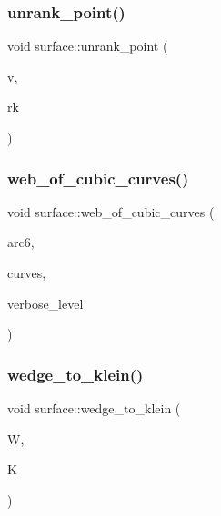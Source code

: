 \mbox{\label{classsurface_a69c1875a5c1c69b9ad81a277dd99a0b3}} 
\subsubsection{\texorpdfstring{unrank\+\_\+point()}{unrank\_point()}}
{\footnotesize\ttfamily void surface\+::unrank\+\_\+point (\begin{DoxyParamCaption}\item[{\mbox{\hyperlink{galois_8h_a09fddde158a3a20bd2dcadb609de11dc}{I\+NT}} $\ast$}]{v,  }\item[{\mbox{\hyperlink{galois_8h_a09fddde158a3a20bd2dcadb609de11dc}{I\+NT}}}]{rk }\end{DoxyParamCaption})}

\mbox{\label{classsurface_a1d3f87488282639824a97159d935e068}} 
\subsubsection{\texorpdfstring{web\+\_\+of\+\_\+cubic\+\_\+curves()}{web\_of\_cubic\_curves()}}
{\footnotesize\ttfamily void surface\+::web\+\_\+of\+\_\+cubic\+\_\+curves (\begin{DoxyParamCaption}\item[{\mbox{\hyperlink{galois_8h_a09fddde158a3a20bd2dcadb609de11dc}{I\+NT}} $\ast$}]{arc6,  }\item[{\mbox{\hyperlink{galois_8h_a09fddde158a3a20bd2dcadb609de11dc}{I\+NT}} $\ast$\&}]{curves,  }\item[{\mbox{\hyperlink{galois_8h_a09fddde158a3a20bd2dcadb609de11dc}{I\+NT}}}]{verbose\+\_\+level }\end{DoxyParamCaption})}

\mbox{\label{classsurface_aa6fb4daa3a79dc65bbb30239076a87a5}} 
\subsubsection{\texorpdfstring{wedge\+\_\+to\+\_\+klein()}{wedge\_to\_klein()}}
{\footnotesize\ttfamily void surface\+::wedge\+\_\+to\+\_\+klein (\begin{DoxyParamCaption}\item[{\mbox{\hyperlink{galois_8h_a09fddde158a3a20bd2dcadb609de11dc}{I\+NT}} $\ast$}]{W,  }\item[{\mbox{\hyperlink{galois_8h_a09fddde158a3a20bd2dcadb609de11dc}{I\+NT}} $\ast$}]{K }\end{DoxyParamCaption})}



